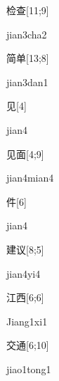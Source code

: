 \begin{verbete}{检查}[11;9]
\begin{pronuncia}{jian3cha2}
\end{pronuncia}
\end{verbete}

\begin{verbete}{简单}[13;8]
\begin{pronuncia}{jian3dan1}
\end{pronuncia}
\end{verbete}

\begin{verbete}[jian4]{见}[4]
\begin{pronuncia}{jian4}
\end{pronuncia}
\end{verbete}

\begin{verbete}{见面}[4;9]
\begin{pronuncia}{jian4mian4}
\end{pronuncia}
\end{verbete}

\begin{verbete}[jian4]{件}[6]
\begin{pronuncia}{jian4}
\end{pronuncia}
\end{verbete}

\begin{verbete}[jian4yi4]{建议}[8;5]
\begin{pronuncia}{jian4yi4}
\end{pronuncia}
\end{verbete}

\begin{verbete}[Jiang1xi1]{江西}[6;6]
\begin{pronuncia}{Jiang1xi1}
\end{pronuncia}
\end{verbete}

\begin{verbete}{交通}[6;10]
\begin{pronuncia}{jiao1tong1}
\end{pronuncia}
\end{verbete}

